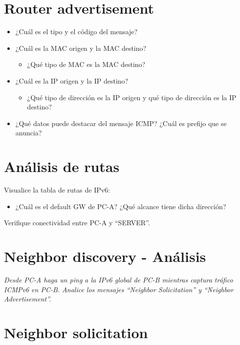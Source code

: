 \documentclass[osajnl,twocolumn,showpacs,superscriptaddress,10pt]{revtex4-1} %
\begin{document}
\section{Router advertisement}

\begin{itemize}
    \item ¿Cuál es el tipo y el código del mensaje?
    \item ¿Cuál es la MAC origen y la MAC destino?
    
    \begin{itemize}
        \item ¿Qué tipo de MAC es la MAC destino?
    \end{itemize}
    
    \item ¿Cuál es la IP origen y la IP destino?
    
    \begin{itemize}
        \item ¿Qué tipo de dirección es la IP origen y qué tipo de dirección es la IP destino?
    \end{itemize}
    
    \item ¿Qué datos puede destacar del mensaje ICMP? ¿Cuál es prefijo que se anuncia?
\end{itemize}

\section{Análisis de rutas}

Visualice la tabla de rutas de IPv6:

\begin{itemize}
    \item ¿Cuál es el default GW de PC-A? ¿Qué alcance tiene dicha dirección?
\end{itemize}

Verifique conectividad entre PC-A y “SERVER”.

\section{Neighbor discovery - Análisis}

\textit{Desde PC-A haga un ping a la IPv6 global de PC-B mientras captura tráfico ICMPv6 en
PC-B. Analice los mensajes “Neighbor Solicitation” y “Neighbor Advertisement”.}

\section{Neighbor solicitation}
\end{document}
